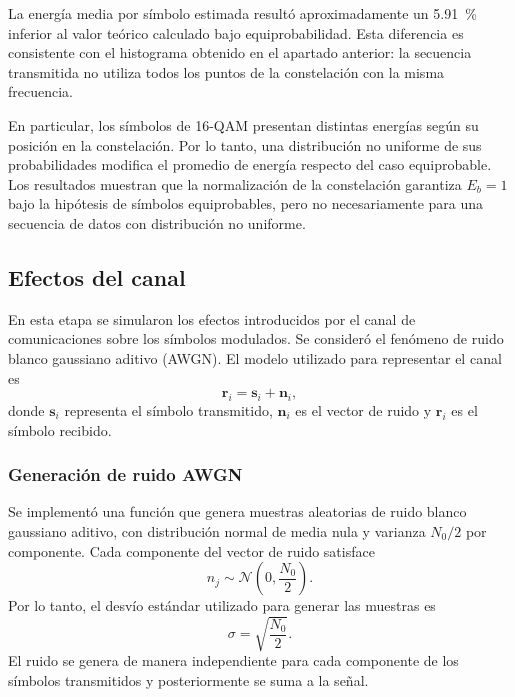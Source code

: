 La energía media por símbolo estimada resultó
aproximadamente un \qty{5.91}{\percent} inferior al valor
teórico calculado bajo equiprobabilidad.
Esta diferencia es consistente con el histograma
obtenido en el apartado anterior: la secuencia
transmitida no utiliza todos los puntos de la
constelación con la misma frecuencia.

En particular, los símbolos de 16-QAM presentan
distintas energías según su posición en la
constelación. Por lo tanto, una distribución no
uniforme de sus probabilidades modifica el
promedio de energía respecto del caso equiprobable.
Los resultados muestran que la normalización de
la constelación garantiza $E_b=1$ bajo la hipótesis
de símbolos equiprobables, pero no necesariamente
para una secuencia de datos con distribución
no uniforme.


\subsection{Efectos del canal}

En esta etapa se simularon los efectos introducidos por el canal
de comunicaciones sobre los símbolos modulados. Se consideró
el fenómeno de ruido blanco gaussiano aditivo (AWGN).
El modelo utilizado para representar el canal es
\begin{equation}
    \mathbf{r}_i = \mathbf{s}_i + \mathbf{n}_i,
\end{equation}
donde $\mathbf{s}_i$ representa el símbolo transmitido,
$\mathbf{n}_i$ es el vector de ruido y $\mathbf{r}_i$ es el símbolo recibido.

\subsubsection{Generación de ruido AWGN}

Se implementó una función que genera muestras aleatorias
de ruido blanco gaussiano aditivo, con distribución normal
de media nula y varianza $N_0/2$ por componente.
Cada componente del vector de ruido satisface
\begin{equation}
    n_j \sim \mathcal{N}\left(0,\frac{N_0}{2}\right).
\end{equation}
Por lo tanto, el desvío estándar utilizado para generar
las muestras es
\begin{equation}
    \sigma = \sqrt{\frac{N_0}{2}}.
\end{equation}
El ruido se genera de manera independiente para cada
componente de los símbolos transmitidos y posteriormente
se suma a la señal.

